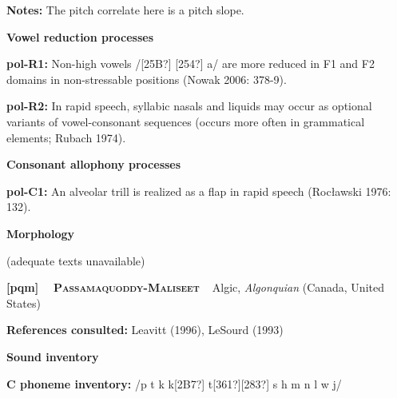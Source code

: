 \begin{styleBody}
\textbf{Notes: }The pitch correlate here is a pitch slope.
\end{styleBody}

\begin{styleBody}
\textbf{Vowel reduction processes}
\end{styleBody}

\begin{styleBody}
\textbf{pol-R1: }Non-high vowels /[25B?] [254?] a/ are more reduced in F1 and F2 domains in non-stressable positions (Nowak 2006: 378-9).
\end{styleBody}

\begin{styleBody}
\textbf{pol-R2: }In rapid speech, syllabic nasals and liquids may occur as optional variants of vowel-consonant sequences (occurs more often in grammatical elements; Rubach 1974).
\end{styleBody}

\begin{styleBody}
\textbf{Consonant allophony processes}
\end{styleBody}

\begin{styleBody}
\textbf{pol-C1: }An alveolar trill is realized as a flap in rapid speech (Rocławski 1976: 132).
\end{styleBody}

\begin{styleBody}
\textbf{Morphology}
\end{styleBody}

\begin{styleBody}
(adequate texts unavailable)
\end{styleBody}

\clearpage\begin{styleBody}
\textbf{[pqm] }\ \ \textbf{\textsc{Passamaquoddy-Maliseet}}\textbf{\ \ }Algic, \textit{Algonquian} (Canada, United States)
\end{styleBody}

\begin{styleBody}
\textbf{References consulted: }Leavitt (1996), LeSourd (1993)
\end{styleBody}

\begin{styleBody}
\textbf{Sound inventory}
\end{styleBody}

\begin{styleBody}
\textbf{C phoneme inventory:} /p t k k[2B7?] t[361?][283?] s h m n l w j/
\end{styleBody}

